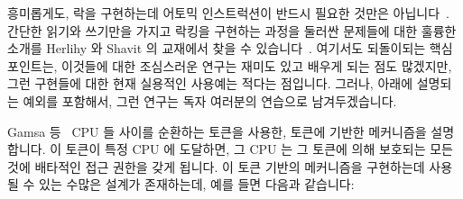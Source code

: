 흥미롭게도, 락을 구현하는데 어토믹 인스트럭션이 반드시 필요한 것만은
아닙니다~\cite{Dijkstra65a,Lamport74a}.
간단한 읽기와 쓰기만을 가지고 락킹을 구현하는 과정을 둘러싼 문제들에 대한
훌륭한 소개를 Herlihy 와 Shavit 의 교재에서 찾을 수
있습니다~\cite{HerlihyShavit2008Textbook}.
여기서도 되돌이되는 핵심 포인트는, 이것들에 대한 조심스러운 연구는 재미도 있고
배우게 되는 점도 많겠지만, 그런 구현들에 대한 현재 실용적인 사용예는 적다는
점입니다.
그러나, 아래에 설명되는 예외를 포함해서, 그런 연구는 독자 여러분의 연습으로
남겨두겠습니다.

Gamsa 등~\cite[Section 5.3]{Gamsa99} CPU 들 사이를 순환하는 토큰을 사용한,
토큰에 기반한 메커니즘을 설명합니다.
이 토큰이 특정 CPU 에 도달하면, 그 CPU 는 그 토큰에 의해 보호되는 모든 것에
배타적인 접근 권한을 갖게 됩니다.
이 토큰 기반의 메커니즘을 구현하는데 사용될 수 있는 수많은 설계가 존재하는데,
예를 들면 다음과 같습니다:

